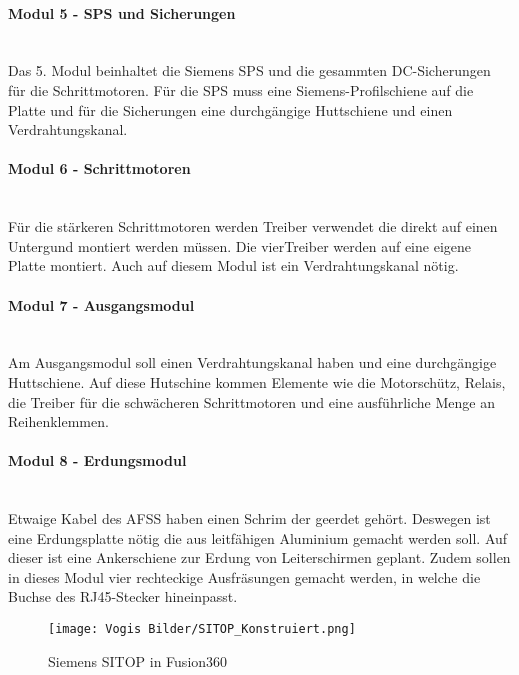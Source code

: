     \paragraph{Modul 5 - SPS und Sicherungen}\mbox{}\\
    Das 5. Modul beinhaltet die Siemens SPS und die gesammten DC-Sicherungen für die Schrittmotoren. Für die SPS muss eine Siemens-Profilschiene auf die Platte und für die Sicherungen eine durchgängige Huttschiene und einen Verdrahtungskanal.
    \paragraph{Modul 6 - Schrittmotoren}\mbox{}\\
    Für die stärkeren Schrittmotoren werden Treiber verwendet die direkt auf einen Untergund montiert werden müssen. Die vierTreiber werden auf eine eigene Platte montiert. Auch auf diesem Modul ist ein Verdrahtungskanal nötig.
    \paragraph{Modul 7 - Ausgangsmodul}\mbox{}\\
    Am Ausgangsmodul soll einen Verdrahtungskanal haben und eine durchgängige Huttschiene. Auf diese Hutschine kommen Elemente wie die Motorschütz, Relais, die Treiber für die schwächeren Schrittmotoren und eine ausführliche Menge an Reihenklemmen.
    \paragraph{Modul 8 - Erdungsmodul}\mbox{}\\
    Etwaige Kabel des AFSS haben einen Schrim der geerdet gehört. Deswegen ist eine Erdungsplatte nötig die aus leitfähigen Aluminium gemacht werden soll. Auf dieser ist eine Ankerschiene zur Erdung von Leiterschirmen geplant. Zudem sollen in dieses Modul vier rechteckige Ausfräsungen gemacht werden, in welche die Buchse des RJ45-Stecker hineinpasst.
    \begin{figure}[h]
        \centering
        \texttt{[image: Vogis Bilder/SITOP\_Konstruiert.png]}
        \caption{Siemens SITOP in Fusion360}
        \label{fig:SITOP_Konstrueiert}
    \end{figure}
